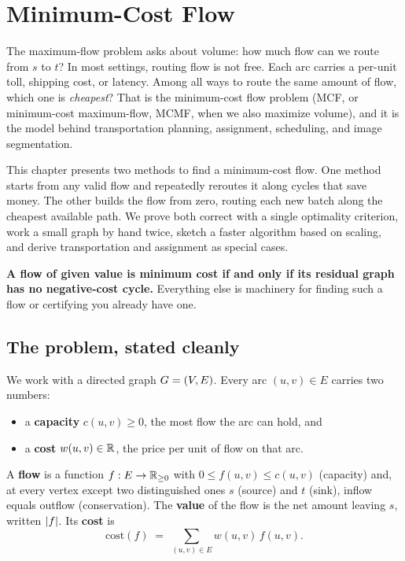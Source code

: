 \chapter{Minimum-Cost Flow}

The maximum-flow problem asks about volume: how much flow can we route from $s$ to $t$? In most settings, routing flow is not free. Each arc carries a per-unit toll, shipping cost, or latency. Among all ways to route the same amount of flow, which one is \emph{cheapest}? That is the minimum-cost flow problem (MCF, or minimum-cost maximum-flow, MCMF, when we also maximize volume), and it is the model behind transportation planning, assignment, scheduling, and image segmentation.

This chapter presents two methods to find a minimum-cost flow. One method starts from any valid flow and repeatedly reroutes it along cycles that save money. The other builds the flow from zero, routing each new batch along the cheapest available path. We prove both correct with a single optimality criterion, work a small graph by hand twice, sketch a faster algorithm based on scaling, and derive transportation and assignment as special cases.

\begin{focusbox}
\textbf{A flow of given value is minimum cost if and only if its residual graph has no negative-cost cycle.} Everything else is machinery for finding such a flow or certifying you already have one.
\end{focusbox}

\chapterline

\section{The problem, stated cleanly}
\label{ch14:problem}

We work with a directed graph $G=(V,E)$. Every arc $(u,v)\in E$ carries two numbers:
\begin{itemize}
  \item a \textbf{capacity} $c(u,v)\ge 0$, the most flow the arc can hold, and
  \item a \textbf{cost} $w(u,v)\in\mathbb{R}$, the price per unit of flow on that arc.
\end{itemize}
A \textbf{flow} is a function $f:E\to\mathbb{R}_{\ge 0}$ with $0\le f(u,v)\le c(u,v)$ (capacity) and, at every vertex except two distinguished ones $s$ (source) and $t$ (sink), inflow equals outflow (conservation). The \textbf{value} of the flow is the net amount leaving $s$, written $\lvert f\rvert$. Its \textbf{cost} is
\[
  \mathrm{cost}(f) \;=\; \sum_{(u,v)\in E} w(u,v)\, f(u,v).
\]

